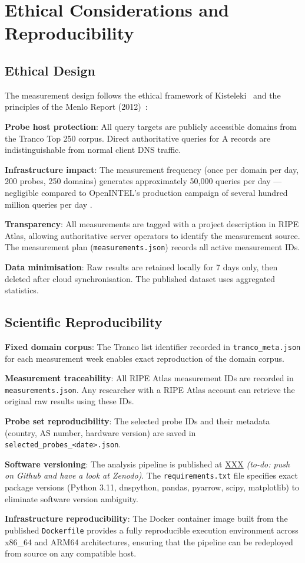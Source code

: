 \bigskip
\section{Ethical Considerations and Reproducibility}
\label{sec:3.6}

\subsection{Ethical Design}
\label{subsec:3.6.1}

The measurement design follows the ethical framework of Kisteleki~\cite{Kisteleki2016} and the principles of the Menlo Report (2012)~\cite{Bailey2012}:

\textbf{Probe host protection}: All query targets are publicly accessible domains from the Tranco Top 250 corpus. Direct authoritative queries for \ac{A} records are indistinguishable from normal client \ac{DNS} traffic.

\textbf{Infrastructure impact}: The measurement frequency (once per domain per day, 200 probes, 250 domains) generates approximately 50,000 queries per day --- negligible compared to OpenINTEL's production campaign of several hundred million queries per day \cite{vanRijswijk2016}.

\textbf{Transparency}: All measurements are tagged with a project description in RIPE Atlas, allowing authoritative server operators to identify the measurement source. The measurement plan (\texttt{measurements.json}) records all active measurement IDs.

\textbf{Data minimisation}: Raw results are retained locally for 7 days only, then deleted after cloud synchronisation. The published dataset uses aggregated statistics.

\subsection{Scientific Reproducibility}
\label{subsec:3.6.2}

\textbf{Fixed domain corpus}: The Tranco list identifier recorded in \texttt{tranco\_meta.json} for each measurement week enables exact reproduction of the domain corpus.

\textbf{Measurement traceability}: All RIPE Atlas measurement IDs are recorded in \texttt{measurements.json}. Any researcher with a RIPE Atlas account can retrieve the original raw results using these IDs.

\textbf{Probe set reproducibility}: The selected probe IDs and their metadata (country, \ac{AS} number, hardware version) are saved in \texttt{selected\_probes\_<date>.json}.

\textbf{Software versioning}: The analysis pipeline is published at \url{XXX} \textit{(to-do: push on Github and have a look at Zenodo)}. The \texttt{requirements.txt} file specifies exact package versions (Python 3.11, dnspython, pandas, pyarrow, scipy, matplotlib) to eliminate software version ambiguity.

\textbf{Infrastructure reproducibility}: The Docker container image built from the published \texttt{Dockerfile} provides a fully reproducible execution environment across x86\_64 and ARM64 architectures, ensuring that the pipeline can be redeployed from source on any compatible host.
